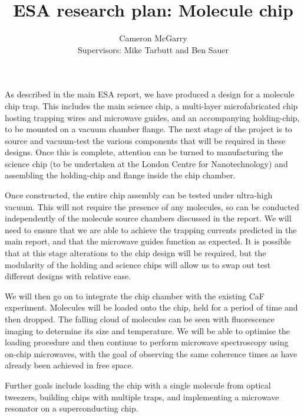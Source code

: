 \documentclass[a4paper]{article}
\title{ESA research plan: Molecule chip}
\author{Cameron McGarry\\ 
Supervisors: Mike Tarbutt and Ben Sauer}
\begin{document}
\maketitle

As described in the main ESA report, we have produced a design for a molecule
chip trap. This includes the main science chip, a multi-layer microfabricated
chip hosting trapping wires and microwave guides, and an accompanying
holding-chip, to be mounted on a vacuum chamber flange. The next stage of the
project is to source and vacuum-test the various components that will be
required in these designs. Once this is complete, attention can be turned to
manufacturing the science chip (to be undertaken at the London Centre for
Nanotechnology) and assembling the holding-chip and flange inside the chip
chamber.

Once constructed, the entire chip assembly can be tested under ultra-high
vacuum. This will not require the presence of any molecules, so can be conducted
independently of the molecule source chambers discussed in the report. We will
need to ensure that we are able to achieve the trapping currents predicted in
the main report, and that the microwave guides function as expected. It is
possible that at this stage alterations to the chip design will be required, but
the modularity of the holding and science chips will allow us to swap out test
different designs with relative ease.

We will then go on to integrate the chip chamber with the existing CaF
experiment. Molecules will be loaded onto the chip, held for a period of time
and then dropped. The falling cloud of molecules can be seen with fluorescence
imaging to determine its size and temperature. We will be able to optimise the
loading procedure and then continue to perform microwave spectroscopy using
on-chip microwaves, with the goal of observing the same coherence times as have
already been achieved in free space.

Further goals include loading the chip with a single molecule from optical
tweezers, building chips with multiple traps, and implementing a microwave
resonator on a superconducting chip.
\end{document}
